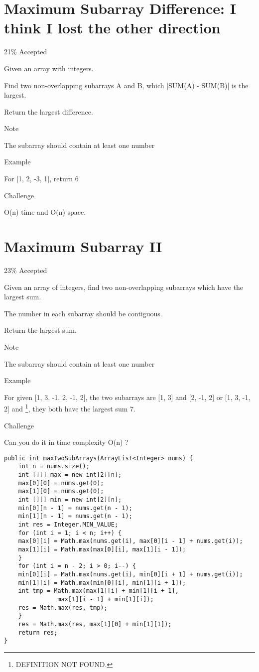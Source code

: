 \documentclass[12pt]{book}
\begin{document}
\chapter{Maximum Subarray Difference: I think I lost the other direction}
\label{sec-38}

21\% Accepted

Given an array with integers.

Find two non-overlapping subarrays A and B, which |SUM(A) - SUM(B)| is the largest.

Return the largest difference.

Note

The subarray should contain at least one number

Example

For [1, 2, -3, 1], return 6

Challenge

O(n) time and O(n) space.
\chapter{Maximum Subarray II}
\label{sec-39}

23\% Accepted

Given an array of integers, find two non-overlapping subarrays which have the largest sum.

The number in each subarray should be contiguous.

Return the largest sum.

Note

The subarray should contain at least one number

Example

For given [1, 3, -1, 2, -1, 2], the two subarrays are [1, 3] and [2, -1, 2] or [1, 3, -1, 2] and \footnote{DEFINITION NOT FOUND.}, they both have the largest sum 7.

Challenge

Can you do it in time complexity O(n) ?
\lstset{language=java,label= ,caption= ,numbers=none}
\begin{lstlisting}
public int maxTwoSubArrays(ArrayList<Integer> nums) {
    int n = nums.size();
    int [][] max = new int[2][n];
    max[0][0] = nums.get(0);
    max[1][0] = nums.get(0);
    int [][] min = new int[2][n];
    min[0][n - 1] = nums.get(n - 1); 
    min[1][n - 1] = nums.get(n - 1);
    int res = Integer.MIN_VALUE;
    for (int i = 1; i < n; i++) {
	max[0][i] = Math.max(nums.get(i), max[0][i - 1] + nums.get(i));
	max[1][i] = Math.max(max[0][i], max[1][i - 1]);
    }
    for (int i = n - 2; i > 0; i--) {
	min[0][i] = Math.max(nums.get(i), min[0][i + 1] + nums.get(i));
	min[1][i] = Math.max(min[0][i], min[1][i + 1]);
	int tmp = Math.max(max[1][i] + min[1][i + 1],
			   max[1][i - 1] + min[1][i]);
	res = Math.max(res, tmp);
    }
    res = Math.max(res, max[1][0] + min[1][1]);
    return res;
}
\end{lstlisting}
\end{document}
